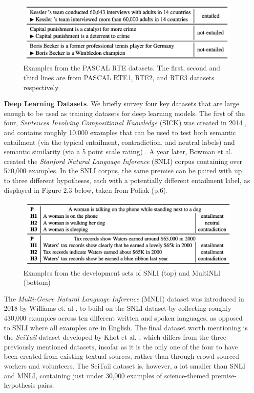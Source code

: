 \documentclass[12pt,twoside]{report}
\begin{document}
\begin{figure}[H]
\centering
\includegraphics[width = 0.8\hsize]{./figures/PASCAL_examples.png}
\caption{Examples from the PASCAL RTE datasets. The first, second and third lines are from PASCAL RTE1, RTE2, and RTE3 datasets respectively}
\label{fig:PASCAL}
\end{figure}

\textbf{Deep Learning Datasets}. We briefly survey four key datasets that are large enough to be used as training datasets for deep learning models. The first of the four, \textit{Sentences Involving Compositional Knowledge} (SICK) was created in 2014 \cite{marelli-etal-2014-sick}, and contains roughly 10,000 examples that can be used to test both semantic entailment (via the typical entailment, contradiction, and neutral labels) and semantic similarity (via a 5 point scale rating) \cite{PARAMASIVAM20229644}. A year later, Bowman et al. \cite{bowman2015} created the \textit{Stanford Natural Language Inference} (SNLI) corpus containing over 570,000 examples. In the SNLI corpus, the same premise can be paired with up to three different hypotheses, each with a potentially different entailment label, as displayed in Figure 2.3 below, taken from Poliak (p.6)\cite{poliak-2020-survey}.

\begin{figure}[H]
\centering
\includegraphics[width = 0.8\hsize]{./figures/SNLI_examples.png}
\caption{Examples from the development sets of SNLI (top) and MultiNLI (bottom)}
\label{fig:SNLI}
\end{figure}

The \textit{Multi-Genre Natural Language Inference} (MNLI) dataset was introduced in 2018 by Williams et. al \cite{williams-etal-2018-broad}, to build on the SNLI dataset by collecting roughly 430,000 examples across ten different written and spoken languages, as opposed to SNLI where all examples are in English. The final dataset worth mentioning is the \textit{SciTail} dataset developed by Khot et al. \cite{Khot_Sabharwal_Clark_2018}, which differs from the three previously mentioned datasets, insofar as it is the only one of the four to have been created from existing textual sources, rather than through crowd-sourced workers and volunteers. The SciTail dataset is, however, a lot smaller than SNLI and MNLI, containing just under 30,000 examples of science-themed premise-hypothesis pairs. \newline \par
\end{document}
